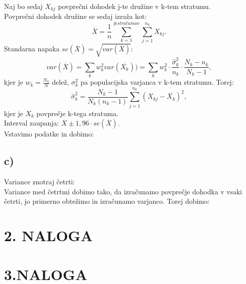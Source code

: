 \documentclass{article}
\begin{document}
Naj bo sedaj $X_{kj}$ povprečni dohodek j-te družine v k-tem stratumu.\\
Povprečni dohodek družine se sedaj izraža kot:
\begin{equation*}
\overline{X} = \frac{1}{n} \sum_{k=1}^{\# stratumov} \sum_{j=1}^{n_k} X_{kj}.
\end{equation*}
Standarna napaka $se(\overline{X}) = \sqrt{var( \overline{X})}$:
\begin{equation*}
var(\overline{X}) = \sum_k w_k^2 var(\overline{X_k}))  = \sum_k w_k^2 \cdot \frac{\hat{\sigma}_k^2}{n_k} \cdot \frac{N_k-n_k}{N_k-1},
\end{equation*}
kjer je $w_k = \frac{N_k}{N}$ delež, $\sigma_k^2$ pa populacijska varjanca v k-tem stratumu. Torej:
\begin{equation*}
\hat{\sigma}_k^2 = \frac{N_k-1}{N_k(n_k-1)} \sum_{j=1}^{n_k} (X_{kj}-\overline{X_k})^2,
\end{equation*}
kjer je $X_k$ povprečje k-tega stratuma.\\
Interval zaupanja: $\overline{X} \pm 1,96 \cdot se(\overline{X})$. \\
Vstavimo podatke in dobimo:


\subsection*{c)}
Variance znotraj četrti:\\
Variance med četrtmi dobimo tako, da izračunamo povprečje dohodka v vsaki četrti, jo primerno obtežimo in izračunamo varjanco. Torej dobimo:

\section*{2. NALOGA}

\section*{3.NALOGA}
\end{document}
